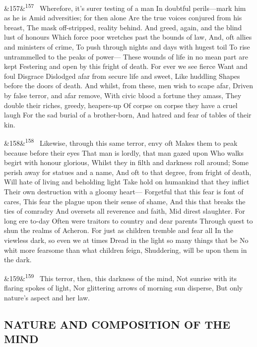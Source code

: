 \documentclass[12pt]{article}
\newcommand{\para}[1][]{\par\noindent\ifx&#1&\else\textsuperscript{\footnotesize #1}~\fi}
\begin{document}
\para[157] Wherefore, it's surer testing of a man In doubtful perils---mark him as he is Amid adversities; for then alone Are the true voices conjured from his breast, The mask off-stripped, reality behind. And greed, again, and the blind lust of honours Which force poor wretches past the bounds of law, And, oft allies and ministers of crime, To push through nights and days with hugest toil To rise untrammelled to the peaks of power--- These wounds of life in no mean part are kept Festering and open by this fright of death. For ever we see fierce Want and foul Disgrace Dislodged afar from secure life and sweet, Like huddling Shapes before the doors of death. And whilst, from these, men wish to scape afar, Driven by false terror, and afar remove, With civic blood a fortune they amass, They double their riches, greedy, heapers-up Of corpse on corpse they have a cruel laugh For the sad burial of a brother-born, And hatred and fear of tables of their kin.

\para[158] Likewise, through this same terror, envy oft Makes them to peak because before their eyes That man is lordly, that man gazed upon Who walks begirt with honour glorious, Whilst they in filth and darkness roll around; Some perish away for statues and a name, And oft to that degree, from fright of death, Will hate of living and beholding light Take hold on humankind that they inflict Their own destruction with a gloomy heart--- Forgetful that this fear is font of cares, This fear the plague upon their sense of shame, And this that breaks the ties of comradry And oversets all reverence and faith, Mid direst slaughter. For long ere to-day Often were traitors to country and dear parents Through quest to shun the realms of Acheron. For just as children tremble and fear all In the viewless dark, so even we at times Dread in the light so many things that be No whit more fearsome than what children feign, Shuddering, will be upon them in the dark.

\para[159] This terror, then, this darkness of the mind, Not sunrise with its flaring spokes of light, Nor glittering arrows of morning sun disperse, But only nature's aspect and her law.

\subsection*{NATURE AND COMPOSITION OF THE MIND}
\end{document}
